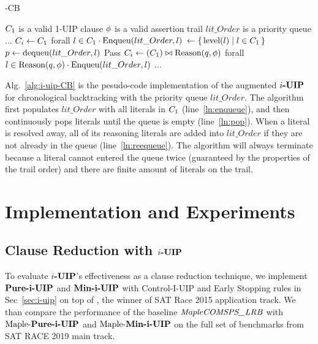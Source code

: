 \documentclass[runningheads]{llncs}
\begin{document}
\begin{algorithm}[t]
\caption{\IUIP-CB}\label{alg:i-uip-CB}
\begin{algorithmic}[1]
\Require  $C_{1}$ is a valid 1-UIP clause
\Require  $\phi$ is a valid assertion trail
\Require  $lit\_Order$ is a priority queue
    \State ...
    \State $C_{i} \gets C_{1} $ 
    \State forall $l \in C_{1} \cdot \text{Enqueu}(lit\_Order, l)$  \label{ln:enqueue}
    \State {} $\gets \{\,\text{level}(l)\mid l \in C_{1}\,\}$
     \label{ln:pop}
        \State $p \gets \text{dequeu}(lit\_Order, l) $ \label{ln:dequeue}
         \label{ln:resolvable}
          \State Pass
        \Else 
            \State  $C_{i} \gets (C_{1} ) \bowtie \text{Reason}(q, \phi)$
            \State   forall $l \in \text{Reason}(q, \phi) \cdot \text{Enqueu}(lit\_Order, l)$ \label{ln:reequeue}
        \EndIf
    \EndWhile
\State ...
\EndProcedure
\end{algorithmic}
\end{algorithm}

Alg.~\ref{alg:i-uip-CB} is the pesudo-code implementation of the
augmented $\textbf{$i$-UIP}$ for chronological backtracking with the priority
queue $lit\_Order$. The algorithm first populates $lit\_Order$ with
all literals in $C_{1}$ (line~\ref{ln:enqueue}), and then
continuously pops literals until the queue is empty
(line~\ref{ln:pop}). When a literal is resolved away, all of its
reasoning literals are added into $lit\_Order$ if they are not already
in the queue (line~\ref{ln:reequeue}). The algorithm will always
terminate because a literal cannot entered the queue twice (guaranteed
by the properties of the trail order) and there are finite amount of
literals on the trail.

\section{Implementation and Experiments}

\subsection{Clause Reduction with $\textbf{$i$-UIP}$}
To evaluate $\textbf{$i$-UIP}$'s effectiveness as a clause reduction technique,
we implement $\textbf{Pure-i-UIP}$ and $\textbf{Min-i-UIP}$ with Control-I-UIP and Early
Stopping rules in Sec~\ref{sec:i-uip} on top of \text{\MapleBase}
\cite{}, the winner of SAT Race 2015 application track.  We than
compare the performance of the baseline $\textit{MapleCOMSPS\_LRB}$ with
$\text{Maple-\textbf{Pure-i-UIP}}$ and $\text{Maple-\textbf{Min-i-UIP}}$ on the full set of benchmarks from
SAT RACE 2019 main track.
\end{document}
